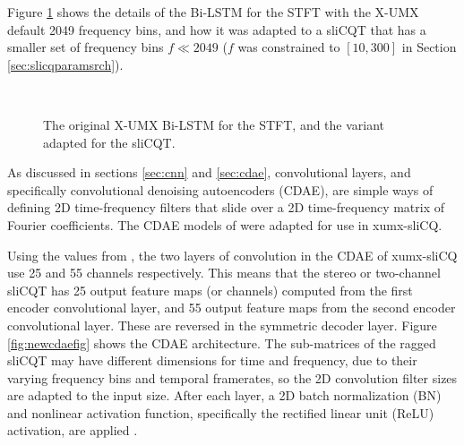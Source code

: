 \documentclass[report.tex]{subfiles}
\begin{document}
Figure \ref{fig:umxnetworkdetails} shows the details of the Bi-LSTM for the STFT with the X-UMX default 2049 frequency bins, and how it was adapted to a sliCQT that has a smaller set of frequency bins $f \ll 2049$ ($f$ was constrained to $[10, 300]$ in Section \ref{sec:slicqparamsrch}).

\begin{figure}[ht]
	\centering
	\\
	\caption{The original X-UMX Bi-LSTM for the STFT, and the variant adapted for the sliCQT.}
	\label{fig:umxnetworkdetails}
\end{figure}

As discussed in sections \ref{sec:cnn} and \ref{sec:cdae}, convolutional layers, and specifically convolutional denoising autoencoders (CDAE), are simple ways of defining 2D time-frequency filters that slide over a 2D time-frequency matrix of Fourier coefficients. The CDAE models of \textcite{plumbley1, plumbley2} were adapted for use in xumx-sliCQ.

Using the values from \textcite{plumbley2}, the two layers of convolution in the CDAE of xumx-sliCQ use 25 and 55 channels respectively. This means that the stereo or two-channel sliCQT has 25 output feature maps (or channels) computed from the first encoder convolutional layer, and 55 output feature maps from the second encoder convolutional layer. These are reversed in the symmetric decoder layer. Figure \ref{fig:newcdaefig} shows the CDAE architecture. The sub-matrices of the ragged sliCQT may have different dimensions for time and frequency, due to their varying frequency bins and temporal framerates, so the 2D convolution filter sizes are adapted to the input size. After each layer, a 2D batch normalization (BN) and nonlinear activation function, specifically the rectified linear unit (ReLU) activation, are applied \parencite{plumbley2}.
\end{document}
